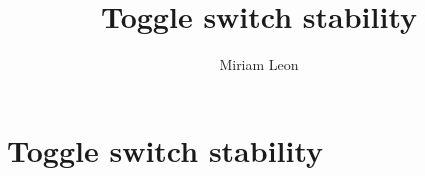 \documentclass[]{chapter_only}
\title{Toggle switch stability}
\author{Miriam Leon}
\begin{document}

\tableofcontents*
{}


\mainmatter*
\chapter{Toggle switch stability}




\printbibliography
\end{document}
